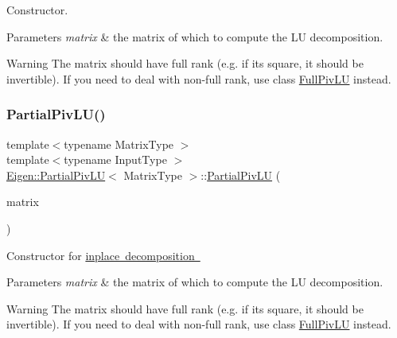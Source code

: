 Constructor.


\begin{DoxyParams}{Parameters}
{\em matrix} & the matrix of which to compute the LU decomposition.\\
\hline
\end{DoxyParams}
\begin{DoxyWarning}{Warning}
The matrix should have full rank (e.\+g. if it\textquotesingle{}s square, it should be invertible). If you need to deal with non-\/full rank, use class \mbox{\hyperlink{class_eigen_1_1_full_piv_l_u}{Full\+Piv\+LU}} instead. 
\end{DoxyWarning}
\mbox{\label{class_eigen_1_1_partial_piv_l_u_a4efc917d31d0e9d76781a97509309061}} 
\subsubsection{\texorpdfstring{PartialPivLU()}{PartialPivLU()}\hspace{0.1cm}{\footnotesize\ttfamily [4/4]}}
{\footnotesize\ttfamily template$<$typename Matrix\+Type $>$ \\
template$<$typename Input\+Type $>$ \\
\mbox{\hyperlink{class_eigen_1_1_partial_piv_l_u}{Eigen\+::\+Partial\+Piv\+LU}}$<$ Matrix\+Type $>$\+::\mbox{\hyperlink{class_eigen_1_1_partial_piv_l_u}{Partial\+Piv\+LU}} (\begin{DoxyParamCaption}\item[{\mbox{\hyperlink{struct_eigen_1_1_eigen_base}{Eigen\+Base}}$<$ Input\+Type $>$ \&}]{matrix }\end{DoxyParamCaption})\hspace{0.3cm}{\ttfamily [explicit]}}

Constructor for \mbox{\hyperlink{}{inplace decomposition }}


\begin{DoxyParams}{Parameters}
{\em matrix} & the matrix of which to compute the LU decomposition.\\
\hline
\end{DoxyParams}
\begin{DoxyWarning}{Warning}
The matrix should have full rank (e.\+g. if it\textquotesingle{}s square, it should be invertible). If you need to deal with non-\/full rank, use class \mbox{\hyperlink{class_eigen_1_1_full_piv_l_u}{Full\+Piv\+LU}} instead. 
\end{DoxyWarning}



